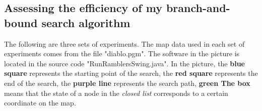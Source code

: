 \documentclass[
]{article}
\begin{document}
\hypertarget{header-n376}{%
\subsection{Assessing the efficiency of my branch-and-bound search
algorithm}\label{header-n376}}

The following are three sets of experiments. The map data used in each
set of experiments comes from the file "diablo.pgm". The software in the
picture is located in the source code "RunRamblersSwing.java". In the
picture, the \textbf{blue square} represents the starting point of the
search, the \textbf{red square} represents the end of the search, the
\textbf{purple line} represents the search path, \textbf{green The box}
means that the state of a node in the \emph{closed list} corresponds to
a certain coordinate on the map.
\end{document}
